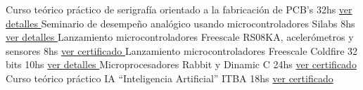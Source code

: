 \documentclass[11pt,a4paper,sans]{moderncv}  %
\begin{document}
 { Curso teórico práctico de serigrafía orientado a la fabricación de PCB's         } { 32hs                                      } { \href                                                                { http://disenioconingenio.com.ar/producto.php?products_id=389 }                                  { ver detalles                                                                                  }                 } { }                    { }
 { Seminario de desempeño analógico usando microcontroladores Silabs                } { 8hs                                       } { \href                                                                { http://disenioconingenio.com.ar/producto.php?products_id=395 }                                  { ver detalles                                                                                  }                 } { }                    { }
 { Lanzamiento microcontroladores Freescale RS08KA, acelerómetros y sensores        } { 8hs                                       } { \href                                                                { http://disenioconingenio.com.ar/producto.php?products_id=384 }                                  { ver certificado                                                                               }                 } { }                    { }
 { Lanzamiento microcontroladores Freescale Coldfire 32 bits                        } { 10hs                                      } { \href                                                                { http://disenioconingenio.com.ar/producto.php?products_id=385 }                                  { ver detalles                                                                                  }                 } { }                    { }
 { Microprocesadores Rabbit y Dinamic C                                             } { 24hs                                      } { \href                                                                { http://disenioconingenio.com.ar/producto.php?products_id=386 }                                  { ver certificado                                                                               }                 } { }                    { }
 { Curso teórico práctico IA “Inteligencia Artificial”                              } { ITBA                                      } { 18hs                                                               } { \href                                                                                           { http://disenioconingenio.com.ar/producto.php?products_id=387                            }                         { ver certificado }  } { } { }
\end{document}
